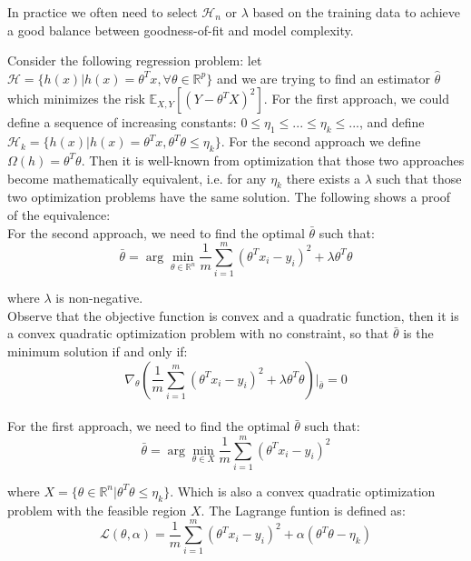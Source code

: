 \noindent In practice we often need to select $\mathcal{H}_n$ or $\lambda$ based on the training data to achieve a good balance between goodness-of-fit and model complexity.\\
\begin{example}
	\noindent Consider the following regression problem: let $\mathcal{H} = \{h(x) | h(x)=\theta^Tx, \forall \theta \in \mathbb{R}^p\}$ and we are trying to find an estimator $\hat{\theta}$ which minimizes the risk $\mathbb{E}_{X,Y}[(Y-\theta^TX)^2]$. For the first approach, we could define a sequence of increasing constants: $0\leq \eta_1 \leq ... \leq \eta_k \leq ...$, and define $\mathcal{H}_k = \{h(x) | h(x)=\theta^Tx, \theta^T\theta \leq \eta_k\}$. For the
	second approach we define $\Omega(h) = \theta^T\theta$. Then it is well-known from optimization that those two approaches
	become mathematically equivalent, i.e. for any $\eta_k$ there exists a $\lambda$ such that those two optimization problems
	have the same solution. The following shows a proof of the equivalence:\\
	
	\noindent For the second approach, we need to find the optimal $\bar{\theta}$ such that:
	\begin{equation}
	\bar{\theta} = \arg\min_{\theta \in \mathbb{R}^n}\frac{1}{m} \sum_{i=1}^{m} (\theta^Tx_i-y_i)^2+\lambda \theta^T\theta 
	\end{equation}
	
	where $\lambda$ is non-negative.\\
	
	Observe that the objective function is convex and a quadratic function, then it is a convex quadratic optimization problem with no constraint, so that $\bar{\theta}$ is the minimum solution if and only if:
	\begin{equation}
	\nabla_\theta (\frac{1}{m} \sum_{i=1}^{m}(\theta^Tx_i-y_i)^2+\lambda \theta^T\theta )|_{\bar {\theta}} = 0 
	\end{equation}\\
	
	\noindent For the first approach, we need to find the optimal $\bar{\theta}$ such that:
	\begin{equation}
	\bar{\theta} = \arg\min_{\theta \in X}\frac{1}{m} \sum_{i=1}^{m} (\theta^Tx_i-y_i)^2 
	\end{equation}
	
	where $X = \{\theta \in \mathbb{R}^n | \theta^T\theta \leq \eta_k \}$.
	Which is also a convex quadratic optimization problem with the feasible region $X$.
	The Lagrange funtion is defined as:
	\begin{equation}
	\mathcal{L}(\theta, \alpha) = \frac{1}{m} \sum_{i=1}^{m} (\theta^Tx_i-y_i)^2+\alpha (\theta^T\theta-\eta_k)	 
	\end{equation}
	

\end{example}

